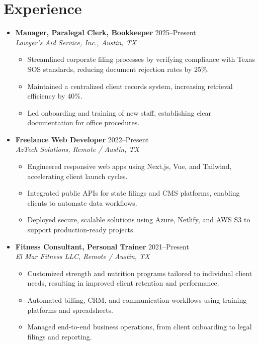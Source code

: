 \documentclass[letterpaper,10pt]{article}
\newcommand{\resumeItem}[1]{\item\small{#1}}
\begin{document}
\section*{Experience}
\begin{itemize}[leftmargin=0in]
  \item[]
    \textbf{Manager, Paralegal Clerk, Bookkeeper} \hfill 2025–Present \\
    \textit{Lawyer's Aid Service, Inc., Austin, TX}
    \begin{itemize}[leftmargin=0in]
      \resumeItem{Streamlined corporate filing processes by verifying compliance with Texas SOS standards, reducing document rejection rates by 25\%.}
      \resumeItem{Maintained a centralized client records system, increasing retrieval efficiency by 40\%.}
      \resumeItem{Led onboarding and training of new staff, establishing clear documentation for office procedures.}
    \end{itemize}

  \item[]
    \textbf{Freelance Web Developer} \hfill 2022–Present \\
    \textit{AzTech Solutions, Remote / Austin, TX}
    \begin{itemize}[leftmargin=0.15in]
      \resumeItem{Engineered responsive web apps using Next.js, Vue, and Tailwind, accelerating client launch cycles.}
      \resumeItem{Integrated public APIs for state filings and CMS platforms, enabling clients to automate data workflows.}
      \resumeItem{Deployed secure, scalable solutions using Azure, Netlify, and AWS S3 to support production-ready projects.}
    \end{itemize}

  \item[]
    \textbf{Fitness Consultant, Personal Trainer} \hfill 2021–Present \\
    \textit{El Mar Fitness LLC, Remote / Austin, TX}
    \begin{itemize}[leftmargin=0.15in]
      \resumeItem{Customized strength and nutrition programs tailored to individual client needs, resulting in improved client retention and performance.}
      \resumeItem{Automated billing, CRM, and communication workflows using training platforms and spreadsheets.}
      \resumeItem{Managed end-to-end business operations, from client onboarding to legal filings and reporting.}
    \end{itemize}
\end{itemize}
\end{document}
